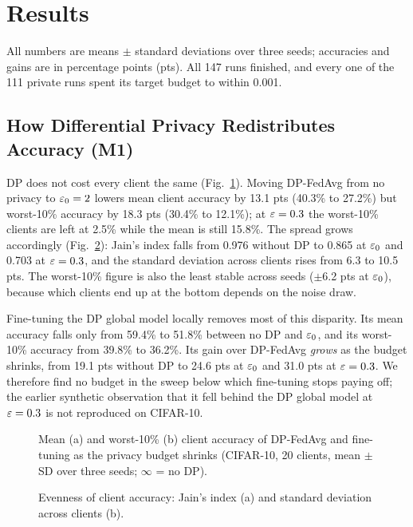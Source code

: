 \section{Results}\label{sec:results}
All numbers are means $\pm$ standard deviations over three seeds; accuracies and gains are in percentage points
(pts). All 147 runs finished, and every one of the 111 private runs spent its target budget to within 0.001.

\subsection{How Differential Privacy Redistributes Accuracy (M1)}
DP does not cost every client the same (Fig.~\ref{fig:m1acc}). Moving DP-FedAvg from no privacy to $\varepsilon_0=2$ lowers
mean client accuracy by 13.1 pts (40.3\% to 27.2\%) but worst-10\% accuracy by 18.3 pts (30.4\% to 12.1\%); at
$\varepsilon=0.3$ the worst-10\% clients are left at 2.5\% while the mean is still 15.8\%. The spread grows accordingly
(Fig.~\ref{fig:m1fair}): Jain's index falls from 0.976 without DP to 0.865 at $\varepsilon_0$ and 0.703 at $\varepsilon=0.3$, and
the standard deviation across clients rises from 6.3 to 10.5 pts. The worst-10\% figure is also the least stable
across seeds ($\pm$6.2 pts at $\varepsilon_0$), because which clients end up at the bottom depends on the noise draw.

Fine-tuning the DP global model locally removes most of this disparity. Its mean accuracy falls only from 59.4\% to
51.8\% between no DP and $\varepsilon_0$, and its worst-10\% accuracy from 39.8\% to 36.2\%. Its gain over DP-FedAvg
\emph{grows} as the budget shrinks, from 19.1 pts without DP to 24.6 pts at $\varepsilon_0$ and 31.0 pts at $\varepsilon=0.3$. We
therefore find no budget in the sweep below which fine-tuning stops paying off; the earlier synthetic observation
that it fell behind the DP global model at $\varepsilon=0.3$ is not reproduced on CIFAR-10.

\begin{figure}[!t]
\centering
{}
\caption{Mean (a) and worst-10\% (b) client accuracy of DP-FedAvg and fine-tuning as the privacy budget shrinks
(CIFAR-10, 20 clients, mean $\pm$ SD over three seeds; $\infty$ = no DP).}
\label{fig:m1acc}
\end{figure}

\begin{figure}[!t]
\centering
{}
\caption{Evenness of client accuracy: Jain's index (a) and standard deviation across clients (b).}
\label{fig:m1fair}
\end{figure}

